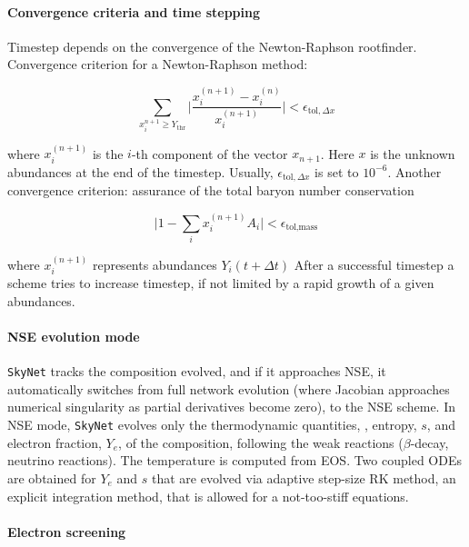 \paragraph{Convergence criteria and time stepping}

Timestep depends on the convergence of the Newton-Raphson rootfinder. 
Convergence criterion for a Newton-Raphson method:

\begin{equation}
\sum_{x_i^{n+1}\geq Y_{\text{thr}}}\Bigg|\frac{x_{i}^{(n+1)} - x_{i}^{(n)}}{x_{i}^{(n+1)}}\Bigg| < \epsilon_{\text{tol},\Delta x}
\end{equation}

where $x_{i}^{(n+1)}$ is the $i$-th component of the vector $x_{n+1}$. Here $x$ is the unknown abundances at the end of the timestep. Usually, $\epsilon_{\text{tol},\Delta x}$ is set to $10^{-6}$.
Another convergence criterion: assurance of the total baryon number conservation 

\begin{equation}
\Bigg| 1- \sum_i x_i^{(n+1)}A_i \Bigg| < \epsilon_{\text{tol},\text{mass}}
\end{equation}

where $x_{i}^{(n+1)}$ represents abundances $Y_i(t+\Delta t)$
After a successful timestep a scheme tries to increase timestep, if not limited by a rapid growth of a given abundances. 


\paragraph{\ac{NSE} evolution mode}

\texttt{SkyNet} tracks the composition evolved, and if it approaches \ac{NSE}, it automatically switches from full network evolution (where Jacobian approaches numerical singularity as partial derivatives become zero), to the \ac{NSE} scheme. 
In \ac{NSE} mode, \texttt{SkyNet} evolves only the thermodynamic quantities, \ie, entropy, $s$, and electron fraction, $Y_e$, of the composition, following the weak reactions ($\beta$-decay, neutrino reactions). The temperature is computed from \ac{EOS}. 
Two coupled \acp{ODE} are obtained for $Y_e$ and $s$ that are evolved via adaptive step-size \ac{RK} method, an explicit integration method, that is allowed for a not-too-stiff equations.


\paragraph{Electron screening}

